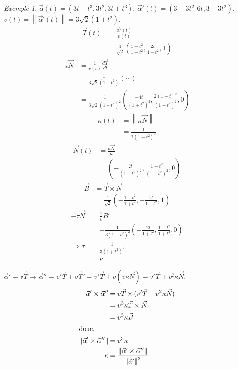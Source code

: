 \documentclass{report}
\theoremstyle{definition}
\theoremstyle{remark}
\newtheorem*{exem}{Exemple}
\newcommand*{\norme}[1]{\left\|#1\right\|}
\begin{document}
	\begin{exem}
		$\vec\alpha(t) = (3t-t^3, 3t^2, 3t+t^3)$. $\vec\alpha'(t) = (3-3t^2, 6t, 3+3t^2)$. $v(t) = \norme{\vec\alpha'(t)} = 3\sqrt{2}(1+t^2)$.
		\begin{align*}
			\vec T(t)&= \frac{\vec\alpha'(t)}{v(t)}\\
			&= \frac{1}{\sqrt{2}}\left( \frac{1-t^2}{1+t^2}, \frac{2t}{1+t^2}, 1 \right)
		\end{align*}
		\begin{align*}
			\kappa\vec N&= \frac{1}{v(t)} \frac{d\vec T}{dt}\\
			&= \frac{1}{3\sqrt{2}(1+t^2)} \left( \cdots \right)\\
			&= \frac{1}{3\sqrt{2}(1+t^2)^2} \left( \frac{-4t}{(1+t^2)^2}, \frac{2(1-t)^2}{(1+t^2)^2}, 0 \right)
		\end{align*}
		\begin{align*}
			\kappa(t)&= \norme{\kappa\vec N}\\
			&= \frac{1}{3(1+t^2)^2}
		\end{align*}
		\begin{align*}
			\vec N(t)&= \frac{\kappa\vec N}{\kappa}\\
			&= \left( -\frac{2t}{(1+t^2)^2}, \frac{1-t^2}{(1+t^2)^2}, 0 \right)
		\end{align*}
		\begin{align*}
			\vec B&= \vec T \times \vec N\\
			&= \frac{1}{\sqrt{2}} \left( -\frac{1-t^2}{1+t^2}, -\frac{2t}{1+t^2}, 1 \right)
		\end{align*}
		\begin{align*}
			-\tau\vec N&= \frac{1}{v}\vec B'\\
			&= -\frac{1}{3(1+t^2)^2} \left( -\frac{2t}{1+t^2}, \frac{1-t^2}{1+t^2}, 0 \right)\\
			\Rightarrow\tau&= \frac{1}{3(1+t^2)^2}\\
			&= \kappa
		\end{align*}
	\end{exem}

	$\vec\alpha'=v\vec T \Longrightarrow \vec\alpha'' = v'\vec T+v\vec T' = v'\vec T+v(v\kappa\vec N) = v'\vec T+v^2\kappa\vec N$.
	\begin{align*}
		\vec\alpha' \times \vec\alpha''&= v\vec T \times (v'\vec T+v^2\kappa\vec N)\\
		&= v^3\kappa\vec T \times \vec N\\
		&= v^3\kappa\vec B\\
		\shortintertext{donc,}
		\norme{\vec\alpha' \times \vec\alpha''}&= v^3\kappa\\
		\kappa&= \frac{\norme{\vec\alpha' \times \vec\alpha''}}{\norme{\vec\alpha'}^3}
	\end{align*}
\end{document}
